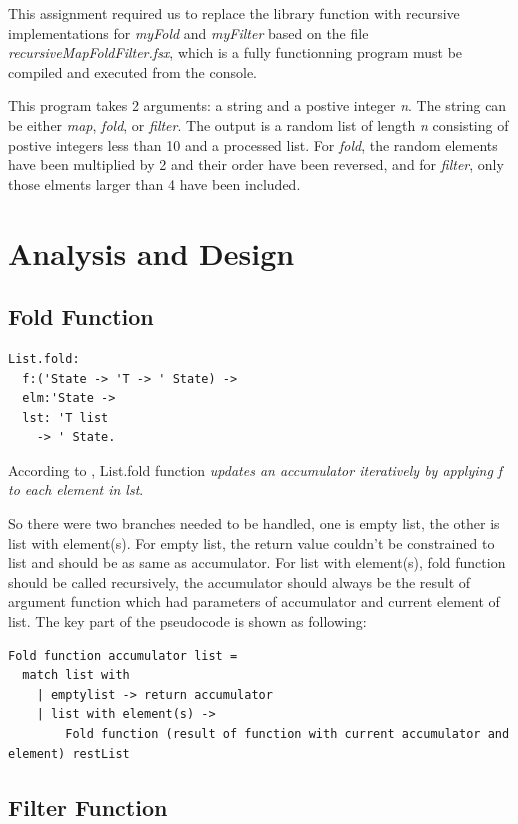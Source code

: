 This assignment required us to replace the library function with recursive implementations for \emph{myFold} and \emph{myFilter} based on the file \emph{recursiveMapFoldFilter.fsx}, which is a fully functionning program must be compiled and executed from the console. 

This program takes 2 arguments: a string and a postive integer \emph{n}. The string can be either \emph{map}, \emph{fold}, or \emph{filter}. The output is a random list of length \emph{n} consisting of postive integers less than 10 and a processed list. For \emph{fold}, the random elements have been multiplied by 2 and their order have been reversed, and for \emph{filter}, only those elments larger than 4 have been included.

\section{Analysis and Design}

\subsection{Fold Function}

\lstset{language=Csh}
\begin{lstlisting}
List.fold: 
  f:('State -> 'T -> ' State) -> 
  elm:'State -> 
  lst: 'T list 
    -> ' State.
\end{lstlisting}

According to \cite{sporring2019}, List.fold function \emph{updates an accumulator iteratively by applying f to each element in lst}. 

So there were two branches needed to be handled, one is empty list, the other is list with element(s). For empty list, the return value couldn't be constrained to list and should be as same as accumulator. For list with element(s), fold function should be called recursively, the accumulator should always be the result of argument function which had parameters of accumulator and current element of list. The key part of the pseudocode is shown as following:

\begin{lstlisting}
Fold function accumulator list =
  match list with
    | emptylist -> return accumulator
    | list with element(s) -> 
        Fold function (result of function with current accumulator and element) restList
\end{lstlisting}

\subsection{Filter Function}

